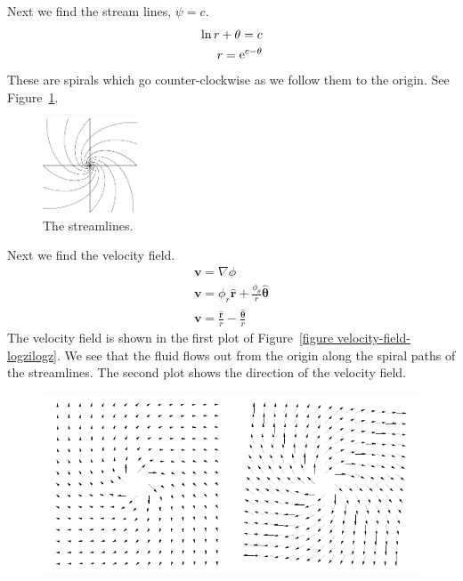 {\begin{Solution}
\begin{enumerate}
    Next we find the stream lines, $\psi = c$.
    \begin{align*}
      \ln r + \theta = c
      \\
      r = \mathop{\mathrm{e}}\nolimits^{c - \theta}
    \end{align*}
    These are spirals which go counter-clockwise as we follow them to the 
    origin.  See Figure~\ref{figure streamlines-logzilogz}.
    \begin{figure}[htb!]
      \begin{center}
        \includegraphics[width=0.25\textwidth]{fcv/analytic/streamlines-logzilogz}
      \end{center}
      \caption{The streamlines.}
      \label{figure streamlines-logzilogz}
    \end{figure}
    Next we find the velocity field.
    \begin{gather*}
      \mathbf{v} = \nabla \phi
      \\
      \mathbf{v} = \phi_r \hat{\mathbf{r}} + \frac{\phi_\theta}{r} \hat{\boldsymbol{\theta}}
      \\
      \mathbf{v} = \frac{ \hat{\mathbf{r}} }{ r } 
      - \frac{ \hat{\boldsymbol{\theta}} }{ r }
    \end{gather*}
    The velocity field is shown in the first plot of
    Figure~\ref{figure velocity-field-logzilogz}.
    We see that the fluid flows out from the origin along the spiral paths 
    of the streamlines.
    The second plot shows the direction of the velocity field.
    \begin{figure}[htb!]
      \begin{center}
        \includegraphics[width=\textwidth]{fcv/analytic/velocity-field-logzilogz}

\end{center}
\end{figure}
\end{enumerate}
\end{Solution}}
